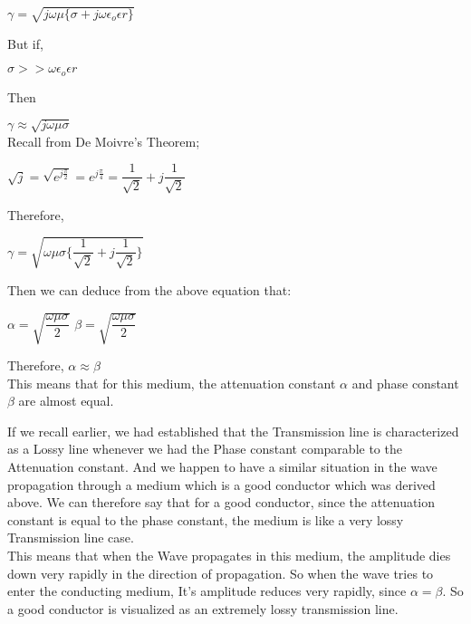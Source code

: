 	\begin{center}
	$\gamma=\sqrt{j\omega\mu\{\sigma+j\omega\epsilon_{o}\epsilon{r}\}}$	
	\end{center}
		
	But if, 
	\begin{center}
		$\sigma>>\omega\epsilon_{o}\epsilon{r}$
	\end{center}
		
	Then
	
	$\gamma\approx\sqrt{j\omega\mu\sigma}$\\
		
	Recall from De Moivre's Theorem;	
		
		\begin{center}
		$\sqrt{j}=\sqrt{e^{j\frac{\pi}{2}}}=e^{j\frac{\pi}{4}}=\dfrac{1}{\sqrt{2}}+j\dfrac{1}{\sqrt{2}}$
		\end{center}
		
		Therefore,\\
		
		\begin{center}		
		$\gamma = \sqrt{\omega\mu\sigma\{\dfrac{1}{\sqrt{2}}+j\dfrac{1}{\sqrt{2}}\}}$
		
		\end{center}
		
		Then we can deduce from the above equation that:
		
		\begin{center}
		
		$\alpha=\sqrt{\dfrac{\omega\mu\sigma}{2}}$  $\beta=\sqrt{\dfrac{\omega\mu\sigma}{2}}$
			
		\end{center}
		
		Therefore,
		$\alpha\approx\beta$\\
		
		This means that for this medium, the attenuation constant $\alpha$ and phase constant $\beta$ are almost equal.
		
		If we recall earlier, we had established that the Transmission line is characterized as a Lossy line whenever we had the Phase constant comparable to the Attenuation constant. And we happen to have a similar situation in the wave propagation through a medium which is a good conductor which was derived above. We can therefore say that for a good conductor, since the attenuation constant is equal to the phase constant, the medium is like a very lossy Transmission line case.\\
		
		This means that when the Wave propagates in this medium, the amplitude dies down very rapidly in the direction of propagation. So when the wave tries to enter the conducting medium, It's amplitude reduces very rapidly, since $\alpha=\beta$. So a good conductor is visualized as an extremely lossy transmission line.\\
		
